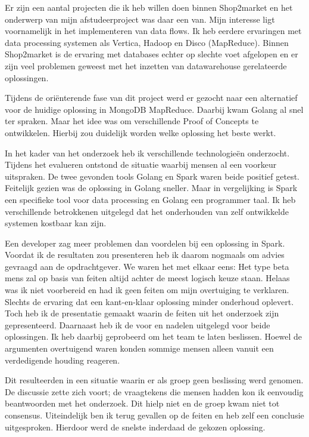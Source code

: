 Er zijn een aantal projecten die ik heb willen doen binnen Shop2market en het onderwerp van mijn afstudeerproject was daar een van. Mijn interesse ligt voornamelijk in het implementeren van data flows. Ik heb eerdere ervaringen met data processing systemen als Vertica, Hadoop en Disco (MapReduce). Binnen Shop2market is de ervaring met databases echter op slechte voet afgelopen en er zijn veel problemen geweest met het inzetten van datawarehouse gerelateerde oplossingen.

Tijdens de oriënterende fase van dit project werd er gezocht naar een alternatief voor de huidige oplossing in MongoDB MapReduce. Daarbij kwam Golang al snel ter spraken. Maar het idee was om verschillende Proof of Concepts te ontwikkelen. Hierbij zou duidelijk worden welke oplossing het beste werkt.

In het kader van het onderzoek heb ik verschillende technologieën onderzocht. Tijdens het evalueren ontstond de situatie waarbij mensen al een voorkeur uitspraken. De twee gevonden tools Golang en Spark waren beide positief getest. Feitelijk gezien was de oplossing in Golang sneller. Maar in vergelijking is Spark een specifieke tool voor data processing en Golang een programmer taal. Ik heb verschillende betrokkenen uitgelegd dat het onderhouden van zelf ontwikkelde systemen kostbaar kan zijn.

Een developer zag meer problemen dan voordelen bij een oplossing in Spark. Voordat ik de resultaten zou presenteren heb ik daarom nogmaals om advies gevraagd aan de opdrachtgever. We waren het met elkaar eens: Het type beta mens zal op basis van feiten altijd achter de meest logisch keuze staan. Helaas was ik niet voorbereid en had ik geen feiten om mijn overtuiging te verklaren. Slechts de ervaring dat een kant-en-klaar oplossing minder onderhoud oplevert. Toch heb ik de presentatie gemaakt waarin de feiten uit het onderzoek zijn gepresenteerd. Daarnaast heb ik de voor en nadelen uitgelegd voor beide oplossingen. Ik heb daarbij geprobeerd om het team te laten beslissen. Hoewel de argumenten overtuigend waren konden sommige mensen alleen vanuit een verdedigende houding reageren.

Dit resulteerden in een situatie waarin er als groep geen beslissing werd genomen. De discussie zette zich voort; de vraagtekens die mensen hadden kon ik eenvoudig beantwoorden met het onderzoek. Dit hielp niet en de groep kwam niet tot consensus. Uiteindelijk ben ik terug gevallen op de feiten en heb zelf een conclusie uitgesproken. Hierdoor werd de snelste inderdaad de gekozen oplossing.

